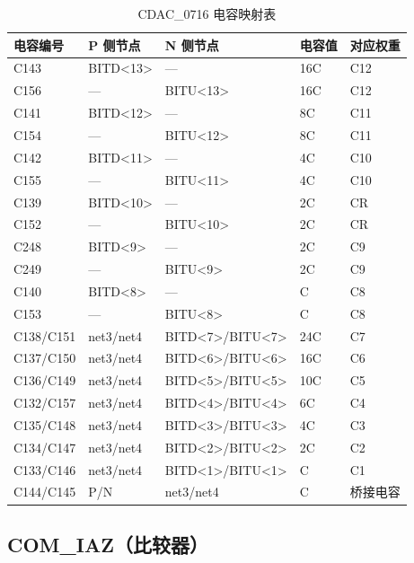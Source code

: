 \documentclass[UTF8,a4paper,11pt]{ctexart}
\begin{document}
\begin{table}[H]
\centering
\caption{CDAC\_0716 电容映射表}
\label{tab:cdac-mapping}
\small
\begin{tabular}{l l l l l}
\toprule
电容编号 & P 侧节点 & N 侧节点 & 电容值 & 对应权重 \\
\midrule
C143     & BITD<13>  & ---       & 16C & C12 \\
C156     & ---       & BITU<13>  & 16C & C12 \\
C141     & BITD<12>  & ---       & 8C  & C11 \\
C154     & ---       & BITU<12>  & 8C  & C11 \\
C142     & BITD<11>  & ---       & 4C  & C10 \\
C155     & ---       & BITU<11>  & 4C  & C10 \\
C139     & BITD<10>  & ---       & 2C  & CR  \\
C152     & ---       & BITU<10>  & 2C  & CR  \\
C248     & BITD<9>   & ---       & 2C  & C9  \\
C249     & ---       & BITU<9>   & 2C  & C9  \\
C140     & BITD<8>   & ---       & C   & C8  \\
C153     & ---       & BITU<8>   & C   & C8  \\
C138/C151 & net3/net4 & BITD<7>/BITU<7> & 24C & C7 \\
C137/C150 & net3/net4 & BITD<6>/BITU<6> & 16C & C6 \\
C136/C149 & net3/net4 & BITD<5>/BITU<5> & 10C & C5 \\
C132/C157 & net3/net4 & BITD<4>/BITU<4> & 6C  & C4 \\
C135/C148 & net3/net4 & BITD<3>/BITU<3> & 4C  & C3 \\
C134/C147 & net3/net4 & BITD<2>/BITU<2> & 2C  & C2 \\
C133/C146 & net3/net4 & BITD<1>/BITU<1> & C   & C1 \\
C144/C145 & P/N       & net3/net4        & C   & 桥接电容 \\
\bottomrule
\end{tabular}
\end{table}

\subsection{COM\_IAZ（比较器）}
\end{document}
